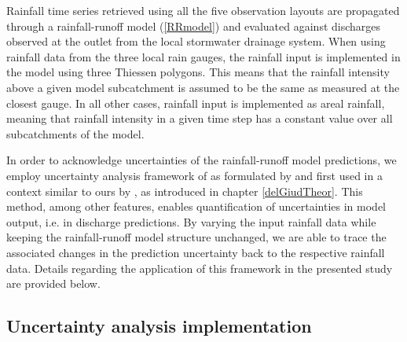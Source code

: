 \documentclass{ctuthesis}\usepackage[]{graphicx}\usepackage[]{color}
\begin{document}
Rainfall time series retrieved using all the five observation layouts are propagated through a rainfall-runoff model (\ref{RRmodel}) and evaluated against discharges observed at the outlet from the local stormwater drainage system. When using rainfall data from the three local rain gauges, the rainfall input is implemented in the model using three Thiessen polygons. This means that the rainfall intensity above a given model subcatchment is assumed to be the same as measured at the closest gauge. In all other cases, rainfall input is implemented as areal rainfall, meaning that rainfall intensity in a given time step has a constant value over all subcatchments of the model. 

In order to acknowledge uncertainties of the rainfall-runoff model predictions, we employ uncertainty analysis framework of \cite{kennedy2001bayesian} as formulated by \cite{reichert2012linking} and first used in a context similar to ours by \cite{giudice2013improving}, as introduced in chapter \ref{delGiudTheor}. This method, among other features, enables quantification of uncertainties in model output, i.e. in discharge predictions. By varying the input rainfall data while keeping the rainfall-runoff model structure unchanged, we are able to trace the associated changes in the prediction uncertainty back to the respective rainfall data. Details regarding the application of this framework in the presented study are provided below.



\subsection{Uncertainty analysis implementation} \label{Pilot_UncAn_Details}
\end{document}
